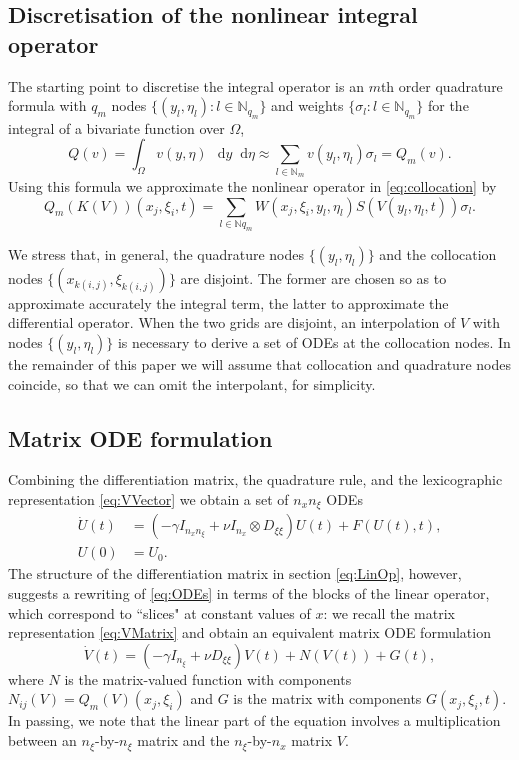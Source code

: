 \documentclass[a4paper,final]{siamart190516}
\newcommand{\Nb}{\mathbb{N}}
\newcommand{\diff}{\mathop{}\!\mathrm{d}}
\begin{document}
\subsection{Discretisation of the nonlinear integral operator} The starting point to
discretise the integral operator is an $m$th order quadrature formula with $q_m$
nodes $\{ (y_l,\eta_l) \colon l \in \Nb_{q_m} \}$ and weights $\{ \sigma_l \colon l
\in \Nb_{q_m} \}$ for the integral of a bivariate function over $\Omega$,
\[
Q(v)=\int_{\Omega} v(y,\eta) \, \diff y  \diff \eta \approx
\sum_{l \in \Nb_m} v(y_l,\eta_l) \sigma_l = Q_m(v).
\]
Using this formula we approximate the nonlinear operator in \eqref{eq:collocation} by
\[
  Q_m(K(V))(x_j,\xi_i,t) = \sum_{l \in \Nb{q_m}} W(x_j,\xi_i,y_l,\eta_l)
  S(V(y_l,\eta_l,t)) \sigma_l .
\]

We stress that, in general, the quadrature nodes $\{ (y_l,\eta_l) \}$ and the
collocation nodes $\{ (x_{k(i,j)}, \xi_{k(i,j)}) \}$ are disjoint. The former are
chosen so as to approximate accurately the integral term, the latter to approximate
the differential operator. When the two grids are disjoint, an interpolation of $V$ with
nodes $\{ (y_l,\eta_l) \}$ is necessary to derive a set of ODEs at the collocation
nodes. In the remainder of this paper we will assume that collocation and quadrature
nodes coincide, so that we can omit the interpolant, for simplicity.

\subsection{Matrix ODE formulation}
Combining the differentiation matrix, the quadrature rule, and the lexicographic
representation \eqref{eq:VVector}
we obtain a set of $n_x n_\xi$ ODEs
\begin{equation}\label{eq:ODEs}
  \begin{aligned}
    \dot U(t) & = (-\gamma I_{n_x n_\xi} + \nu I_{n_x} \otimes D_{\xi \xi} ) U(t) +
  F(U(t),t), \\
  U(0) & = U_0.
  \end{aligned}
\end{equation}
The structure of the differentiation matrix in section \eqref{eq:LinOp}, however,
suggests a rewriting of \eqref{eq:ODEs} in terms of the blocks of the linear
operator, which correspond to ``slices" at constant values of $x$: we recall the
matrix representation \eqref{eq:VMatrix} and obtain an equivalent
matrix ODE formulation
\begin{equation}\label{eq:MatrixODE}
  \dot V(t) = (-\gamma I_{n_\xi} + \nu D_{\xi \xi}) V(t) + N(V(t)) + G(t),
\end{equation}
where $N$ is the matrix-valued function with components $N_{ij}(V) =
Q_m(V)(x_j,\xi_i)$ and $G$ is the matrix with components $G(x_j,\xi_i,t)$. In passing,
we note that the linear part of the equation involves
a multiplication between an $n_\xi$-by-$n_\xi$ matrix and the $n_\xi$-by-$n_x$ matrix $V$. 
\end{document}
